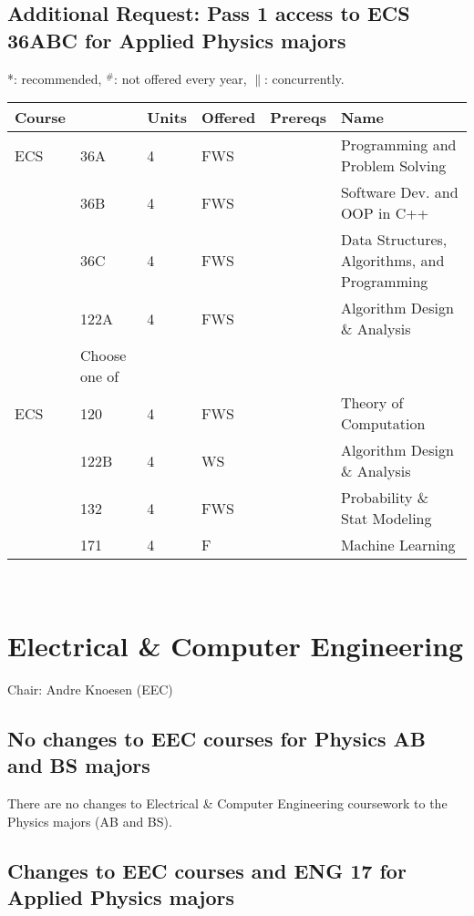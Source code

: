 \documentclass[12pt]{article}
\begin{document}
\subsection{Additional Request: Pass 1 access to ECS 36ABC for Applied Physics majors}

\newpage
{}
\vskip 0.25cm
\noindent
*: recommended, $^\#$: not offered every year, $\parallel$: concurrently.\\
\begin{tabular}{|llllll|}
\hline
Course & & Units & Offered & Prereqs & Name \\
\hline
ECS & 36A  & 4 & FWS & & Programming and Problem Solving\\
    & 36B  & 4 & FWS & & Software Dev. and OOP in C++\\
    & 36C  & 4 & FWS & & Data Structures, Algorithms, and Programming\\
    & 122A & 4 & FWS & & Algorithm Design \& Analysis\\
\hline
\hline
    & Choose one of & & & & \\
\hline
ECS & 120  & 4 & FWS & & Theory of Computation \\
    & 122B & 4 & WS  & & Algorithm Design \& Analysis \\
    & 132  & 4 & FWS & & Probability \& Stat Modeling \\
    & 171  & 4 & F   & & Machine Learning \\
\hline
\end{tabular}\\

\newpage
\section{Electrical \& Computer Engineering}
Chair: Andre Knoesen (EEC)

\subsection{No changes to EEC courses for Physics AB and BS majors}

There are no changes to Electrical \& Computer Engineering coursework
to the Physics majors (AB and BS).

\subsection{Changes to EEC courses and ENG 17 for Applied Physics majors}
\end{document}
